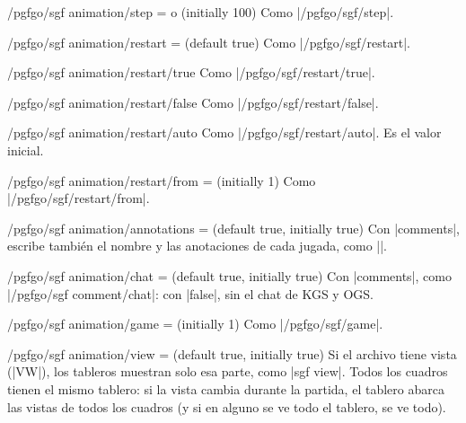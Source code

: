 \begin{key}{/pgfgo/sgf animation/step =  o  (initially 100)}
	Como |/pgfgo/sgf/step|.
\end{key}

\begin{key}{/pgfgo/sgf animation/restart =  (default true)}
	Como |/pgfgo/sgf/restart|.
\end{key}

\begin{key}{/pgfgo/sgf animation/restart/true}
	Como |/pgfgo/sgf/restart/true|.
\end{key}

\begin{key}{/pgfgo/sgf animation/restart/false}
	Como |/pgfgo/sgf/restart/false|.
\end{key}

\begin{key}{/pgfgo/sgf animation/restart/auto}
	Como |/pgfgo/sgf/restart/auto|. Es el valor inicial.
\end{key}

\begin{key}{/pgfgo/sgf animation/restart/from =  (initially 1)}
	Como |/pgfgo/sgf/restart/from|.
\end{key}

\begin{key}{/pgfgo/sgf animation/annotations =  (default true, initially true)}
	Con |comments|, escribe también el nombre y las anotaciones de cada jugada, como |\sgfcomment|.
\end{key}

\begin{key}{/pgfgo/sgf animation/chat =  (default true, initially true)}
	Con |comments|, como |/pgfgo/sgf comment/chat|: con |false|, sin el chat de KGS y OGS.
\end{key}

\begin{key}{/pgfgo/sgf animation/game =  (initially 1)}
	Como |/pgfgo/sgf/game|.
\end{key}

\begin{key}{/pgfgo/sgf animation/view =  (default true, initially true)}
	Si el archivo tiene vista (|VW|), los tableros muestran solo esa parte, como |sgf view|. Todos los cuadros tienen el mismo tablero: si la vista cambia durante la partida, el tablero abarca las vistas de todos los cuadros (y si en alguno se ve todo el tablero, se ve todo).
\end{key}

